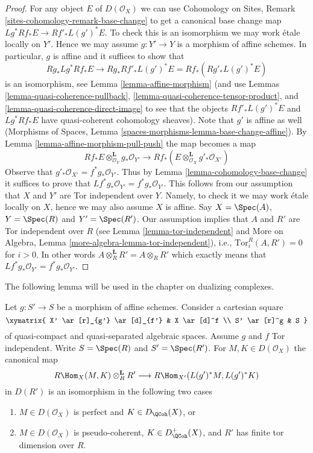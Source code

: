 \begin{proof}
For any object $E$ of $D(\mathcal{O}_X)$ we can use
Cohomology on Sites, Remark \ref{sites-cohomology-remark-base-change}
to get a canonical base change map $Lg^*Rf_*E \to Rf'_*L(g')^*E$. To check this
is an isomorphism we may work \'etale locally on $Y'$. Hence we may assume
$g : Y' \to Y$ is a morphism of affine schemes. In particular, $g$
is affine and it suffices to show that
$$
Rg_*Lg^*Rf_*E \to Rg_*Rf'_*L(g')^*E = Rf_*(Rg'_* L(g')^* E)
$$
is an isomorphism, see Lemma \ref{lemma-affine-morphism}
(and use Lemmas \ref{lemma-quasi-coherence-pullback},
\ref{lemma-quasi-coherence-tensor-product}, and
\ref{lemma-quasi-coherence-direct-image}
to see that the objects $Rf'_*L(g')^*E$ and $Lg^*Rf_*E$
have quasi-coherent cohomology sheaves). Note that $g'$ is
affine as well (Morphisms of Spaces, Lemma
\ref{spaces-morphisms-lemma-base-change-affine}).
By Lemma \ref{lemma-affine-morphism-pull-push} the map becomes a map
$$
Rf_*E \otimes_{\mathcal{O}_Y}^\mathbf{L} g_*\mathcal{O}_{Y'}
\longrightarrow
Rf_*(E \otimes_{\mathcal{O}_X}^\mathbf{L} g'_*\mathcal{O}_{X'})
$$
Observe that $g'_*\mathcal{O}_{X'} = f^*g_*\mathcal{O}_{Y'}$. Thus by
Lemma \ref{lemma-cohomology-base-change} it suffices to prove that
$Lf^*g_*\mathcal{O}_{Y'} = f^*g_*\mathcal{O}_{Y'}$. This follows from our
assumption that $X$ and $Y'$ are Tor independent over $Y$. Namely, to
check it we may work \'etale locally on $X$, hence we may also assume $X$
is affine. Say $X = \Spec(A)$, $Y = \Spec(R)$ and $Y' = \Spec(R')$.
Our assumption implies that $A$ and $R'$ are Tor independent over $R$
(see
Lemma \ref{lemma-tor-independent}
and
More on Algebra, Lemma \ref{more-algebra-lemma-tor-independent}), i.e.,
$\text{Tor}_i^R(A, R') = 0$ for $i > 0$. In other words
$A \otimes_R^\mathbf{L} R' = A \otimes_R R'$ which exactly means
that $Lf^*g_*\mathcal{O}_{Y'} = f^*g_*\mathcal{O}_{Y'}$.
\end{proof}

\noindent
The following lemma will be used in the chapter on dualizing complexes.

\begin{lemma}
\label{lemma-affine-morphism-and-hom-out-of-perfect}
Let $g : S' \to S$ be a morphism of affine schemes.
Consider a cartesian square
$$
\xymatrix{
X' \ar[r]_{g'} \ar[d]_{f'} & X \ar[d]^f \\
S' \ar[r]^g & S
}
$$
of quasi-compact and quasi-separated algebraic spaces. Assume $g$ and $f$
Tor independent. Write $S = \Spec(R)$ and $S' = \Spec(R')$. For
$M, K \in D(\mathcal{O}_X)$ the canonical map
$$
R\Hom_X(M, K) \otimes^\mathbf{L}_R R'
\longrightarrow
R\Hom_{X'}(L(g')^*M, L(g')^*K)
$$
in $D(R')$ is an isomorphism in the following two cases
\begin{enumerate}
\item $M \in D(\mathcal{O}_X)$ is perfect and $K \in D_\QCoh(X)$, or
\item $M \in D(\mathcal{O}_X)$ is pseudo-coherent,
$K \in D_\QCoh^+(X)$, and $R'$ has finite tor dimension over $R$.
\end{enumerate}
\end{lemma}

